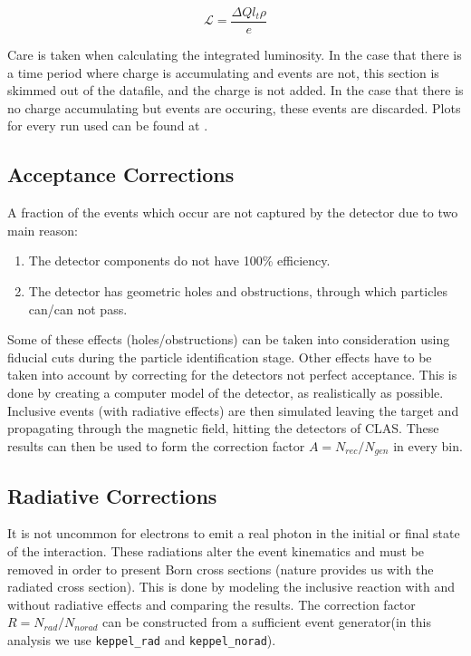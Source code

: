 \begin{equation}
  \mathcal{L} = \frac{\Delta Q l_t \rho}{e}
\end{equation}

Care is taken when calculating the integrated luminosity.  In the case that there is a time period where charge is accumulating and events are not, this section is skimmed out of the datafile, and the charge is not added.  In the case that there is no charge accumulating but events are occuring, these events are discarded.  Plots for every run used can be found at \cite{fcup-website}.


\subsection{Acceptance Corrections}
A fraction of the events which occur are not captured by the detector due to two main reason: 

\begin{enumerate}
  \item The detector components do not have 100\% efficiency.
  \item The detector has geometric holes and obstructions, through which particles can/can not pass.
\end{enumerate}

Some of these effects (holes/obstructions) can be taken into consideration using fiducial cuts during the particle identification stage.  Other effects  have to be taken into account by correcting for the detectors not perfect acceptance.  This is done by creating a computer model of the detector, as realistically as possible.  Inclusive events (with radiative effects) are then simulated leaving the target and propagating through the magnetic field, hitting the detectors of CLAS.  These results can then be used to form the correction factor $A = N_{rec}/N_{gen}$ in every bin.  

\subsection{Radiative Corrections}
It is not uncommon for electrons to emit a real photon in the initial or final state of the interaction.  These radiations alter the event kinematics and must be removed in order to present Born cross sections (nature provides us with the radiated cross section).  This is done by modeling the inclusive reaction with and without radiative effects and comparing the results.  The correction factor $R = N_{rad}/N_{no rad}$ can be constructed from a sufficient event generator(in this analysis we use \texttt{keppel\_rad} and \texttt{keppel\_norad}).  

